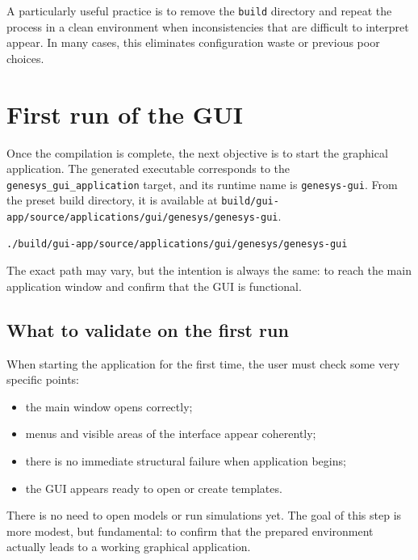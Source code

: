 A particularly useful practice is to remove the \texttt{build} directory and repeat the process in a clean environment when inconsistencies that are difficult to interpret appear. In many cases, this eliminates configuration waste or previous poor choices.

\section{First run of the GUI}
\label{sec:cap2_primeira_execucao_gui}

Once the compilation is complete, the next objective is to start the graphical application. The generated executable corresponds to the \texttt{genesys\_gui\_application} target, and its runtime name is \texttt{genesys-gui}. From the preset build directory, it is available at \texttt{build/gui-app/source/applications/gui/genesys/genesys-gui}.

\begin{lstlisting}[language=bash,caption={Generic Example of the First GUI Run},label={lst:cap2_primeira_execucao_gui}]
./build/gui-app/source/applications/gui/genesys/genesys-gui
\end{lstlisting}

The exact path may vary, but the intention is always the same: to reach the main application window and confirm that the GUI is functional.

\subsection{What to validate on the first run}
\label{subsec:cap2_o_que_validar_primeira_execucao}

When starting the application for the first time, the user must check some very specific points:

\begin{itemize}
\item the main window opens correctly;
\item menus and visible areas of the interface appear coherently;
\item there is no immediate structural failure when application begins;
\item the GUI appears ready to open or create templates.
\end{itemize}

There is no need to open models or run simulations yet. The goal of this step is more modest, but fundamental: to confirm that the prepared environment actually leads to a working graphical application.

